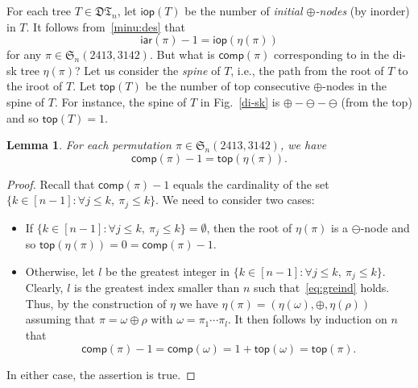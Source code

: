 \documentclass[12pt]{amsart}
\numberwithin{equation}{section}
\def\red{\textcolor{red}}
\theoremstyle{plain}
\newtheorem{lemma}[theorem]{Lemma}
\theoremstyle{definition}
\newtheorem{remark}[theorem]{Remark}
\def\S{\mathfrak{S}}
\def\iar{\mathsf{iar}}
\def\comp{\mathsf{comp}}
\newcommand{\DT}{\mathfrak{DT}}
\def\iop{\mathsf{iop}}
\def\top{\mathsf{top}}
\begin{document}
For each tree $T\in\DT_n$, let $\iop(T)$ be the number of {\em initial $\oplus$-nodes}  (by inorder) in $T$.
It follows from~\eqref{minu:des}  that 
\begin{equation}\label{eq:iop}
\iar(\pi)-1=\iop(\eta(\pi))
\end{equation}
 for any  $\pi\in\S_n(2413,3142)$. 
 But what is $\comp(\pi)$ corresponding to in the di-sk tree $\eta(\pi)$? Let us consider the {\em spine} of $T$, i.e., the path from the root of $T$ to the iroot of $T$. Let $\top(T)$ be the number of top consecutive $\oplus$-nodes in the spine of $T$. For instance, the spine of $T$ in Fig.~\ref{di-sk} is $\oplus-\ominus-\ominus$ (from the top) and so $\top(T)=1$.
 \red{
 }
\begin{lemma}\label{lem:sep2}
For each permutation $\pi\in\S_n(2413,3142)$,  we have  
$$\comp(\pi)-1=\top(\eta(\pi)).
$$
\end{lemma}
\begin{proof}
Recall that $\comp(\pi)-1$ equals the cardinality of the set $\{k\in [n-1]: \forall j\leq k,\: \pi_j\leq k\}$. 
We need to consider two cases:
\begin{itemize}
\item If $\{k\in [n-1]: \forall j\leq k,\: \pi_j\leq k\}=\emptyset$, then the root of $\eta(\pi)$ is a $\ominus$-node and so $\top(\eta(\pi))=0=\comp(\pi)-1$. 
\item Otherwise, let $l$ be the greatest integer in $\{k\in [n-1]: \forall j\leq k,\: \pi_j\leq k\}$. Clearly,  $l$ is the greatest index smaller than $n$ such that~\eqref{eq:greind} holds. Thus, by the construction of $\eta$ we have  $\eta(\pi)=(\eta(\omega),\oplus,\eta(\rho))$ assuming that $\pi=\omega\oplus\rho$ with $\omega=\pi_1\cdots\pi_l$. It then follows by induction on $n$ that 
$$
\comp(\pi)-1=\comp(\omega)=1+\top(\omega)=\top(\pi).
$$
\end{itemize}
In either case, the assertion is true. 
\end{proof}
\end{document}
